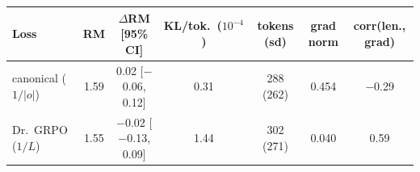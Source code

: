 \begin{tabular}{@{}lcccccc@{}}
\toprule
Loss & RM & $\Delta$RM [95\% CI] & KL/tok.\ ($10^{-4}$) & tokens (sd) & grad norm & corr(len., grad) \\
\midrule
canonical ($1/|o|$) & 1.59 & 0.02 [$-$0.06, 0.12] & 0.31 & 288 (262) & 0.454 & $-$0.29 \\
Dr.\ GRPO ($1/L$) & 1.55 & $-$0.02 [$-$0.13, 0.09] & 1.44 & 302 (271) & 0.040 & 0.59 \\
\bottomrule
\end{tabular}
